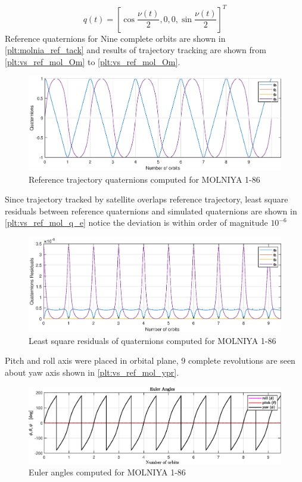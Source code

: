 \begin{equation*}
q( t) =\left[\cos\frac{\nu ( t)}{2} ,0,0,\sin\frac{\nu ( t)}{2}\right]^{T}
\end{equation*}
Reference quaternions for Nine complete orbits are shown in \autoref{plt:molnia_ref_tack} and results of trajectory tracking are shown from \autoref{plt:vs_ref_mol_Om} to \autoref{plt:vs_ref_mol_Om}.

\begin{figure}[H]
     \centering
    \includegraphics[width=0.9\columnwidth]{figures/plots/VSCMG/molnia_ref_tack.eps}
    \caption{Reference trajectory quaternions computed for MOLNIYA 1-86}
    \label{plt:molnia_ref_tack}
\end{figure}
\noindent Since trajectory tracked by satellite overlaps reference trajectory, least square residuals between reference quaternions and simulated quaternions are shown in \autoref{plt:vs_ref_mol_q_e} notice the deviation is within order of magnitude $10^{-6}$ 
\begin{figure}[H]
     \centering
    \includegraphics[width=0.9\columnwidth]{figures/plots/VSCMG/vs_ref_mol_q_e.eps}
    \caption{Least square residuals of quaternions computed for MOLNIYA 1-86}
    \label{plt:vs_ref_mol_q_e}
\end{figure}
\noindent Pitch and roll axis were placed in orbital plane, 9 complete revolutions are seen about yaw axis shown in \autoref{plt:vs_ref_mol_ypr}.
\begin{figure}[H]
     \centering
    \includegraphics[width=0.9\columnwidth]{figures/plots/VSCMG/vs_ref_mol_ypr.eps}
    \caption{Euler angles computed for MOLNIYA 1-86}
    \label{plt:vs_ref_mol_ypr}
\end{figure}

